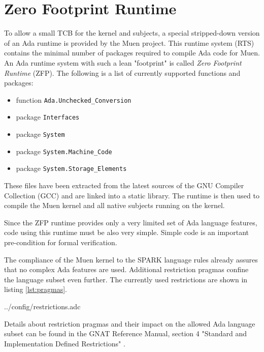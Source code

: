 \section{Zero Footprint Runtime}\label{sec:zfp-rts}
To allow a small TCB for the kernel and subjects, a special stripped-down
version of an Ada runtime is provided by the Muen project. This
runtime system (RTS) contains the minimal number of packages
required to compile Ada code for Muen. An Ada runtime system with such a lean
"footprint" is called \emph{Zero Footprint Runtime} (ZFP). The
following is a list of currently supported functions and packages:

\begin{itemize}
	\item function \texttt{Ada.Unchecked\_Conversion}
	\item package \texttt{Interfaces}
	\item package \texttt{System}
	\item package \texttt{System.Machine\_Code}
	\item package \texttt{System.Storage\_Elements}
\end{itemize}

These files have been extracted from the latest sources of the GNU Compiler
Collection (GCC) \cite{gcc} and are linked into a static library.
The runtime is then used to compile the Muen kernel and all native subjects
running on the kernel.

Since the ZFP runtime provides only a very limited set of Ada language features,
code using this runtime must be also very simple. Simple code is an important
pre-condition for formal verification.

The compliance of the Muen kernel to the SPARK language rules
already assures that no complex Ada features are used. Additional restriction
pragmas confine the language subset even further. The currently
used restrictions are shown in listing \ref{lst:pragmas}.


	{../config/restrictions.adc}

Details about restriction pragmas and their impact on the allowed Ada language
subset can be found in the GNAT Reference Manual, section 4 "Standard and
Implementation Defined Restrictions" \cite{GNAT:manual}.
